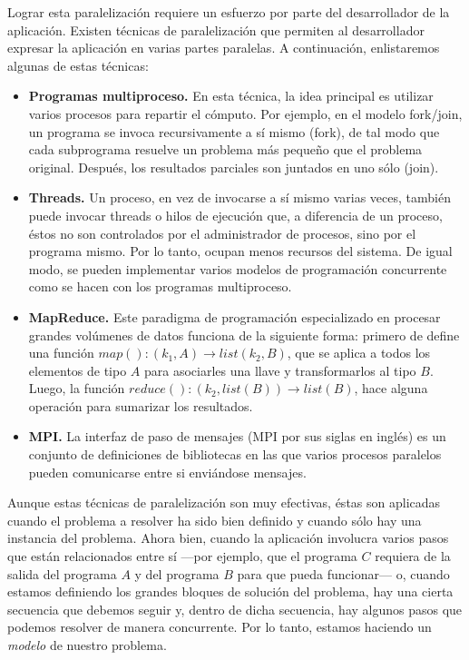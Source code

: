 Lograr esta paralelización requiere un esfuerzo por parte del desarrollador de la aplicación. Existen técnicas de paralelización que permiten al desarrollador expresar la aplicación en varias partes paralelas. A continuación, enlistaremos algunas de estas técnicas:

\begin{itemize}
\item{\textbf{Programas multiproceso.} En esta técnica, la idea principal es utilizar varios procesos para repartir el cómputo. Por ejemplo, en el modelo fork/join, un programa se invoca recursivamente a sí mismo (fork), de tal modo que cada subprograma resuelve un problema más pequeño que el problema original. Después, los resultados parciales son juntados en uno sólo (join).}
\item{\textbf{Threads.} Un proceso, en vez de invocarse a sí mismo varias veces, también puede invocar threads o hilos de ejecución que, a diferencia de un proceso, éstos no son controlados por el administrador de procesos, sino por el programa mismo. Por lo tanto, ocupan menos recursos del sistema. De igual modo, se pueden implementar varios modelos de programación concurrente como se hacen con los programas multiproceso.}
\item{\textbf{MapReduce.} Este paradigma de programación especializado en procesar grandes volúmenes de datos funciona de la siguiente forma: primero de define una función $map(): (k_1,A) \rightarrow list(k_2,B)$, que se aplica a todos los elementos de tipo $A$ para asociarles una llave y transformarlos al tipo $B$. Luego, la función $reduce(): (k_2, list(B)) \rightarrow list(B)$, hace alguna operación para sumarizar los resultados.}
\item{\textbf{MPI.} La interfaz de paso de mensajes (MPI por sus siglas en inglés) es un conjunto de definiciones de bibliotecas en las que varios procesos paralelos pueden comunicarse entre si enviándose mensajes.}
\end{itemize}

Aunque estas técnicas de paralelización son muy efectivas, éstas son aplicadas cuando el problema a resolver ha sido bien definido y cuando sólo hay una instancia del problema. Ahora bien, cuando la aplicación involucra varios pasos que están relacionados entre sí —por ejemplo, que el programa $C$ requiera de la salida del programa $A$ y del programa $B$ para que pueda funcionar— o, cuando estamos definiendo los grandes bloques de solución del problema, hay una cierta secuencia que debemos seguir y, dentro de dicha secuencia, hay algunos pasos que podemos resolver de manera concurrente. Por lo tanto, estamos haciendo un \emph{modelo} de nuestro problema.

